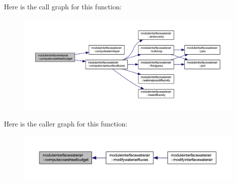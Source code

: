 Here is the call graph for this function\+:\nopagebreak
\begin{figure}[H]
\begin{center}
\leavevmode
\includegraphics[width=350pt]{namespacemoduleinterfacewaterair_a1210cfaa400404020add49f99363970b_cgraph}
\end{center}
\end{figure}
Here is the caller graph for this function\+:\nopagebreak
\begin{figure}[H]
\begin{center}
\leavevmode
\includegraphics[width=350pt]{namespacemoduleinterfacewaterair_a1210cfaa400404020add49f99363970b_icgraph}
\end{center}
\end{figure}
\mbox{\label{namespacemoduleinterfacewaterair_a542e31b196bb8758541444a1a4f7bd77}} 

